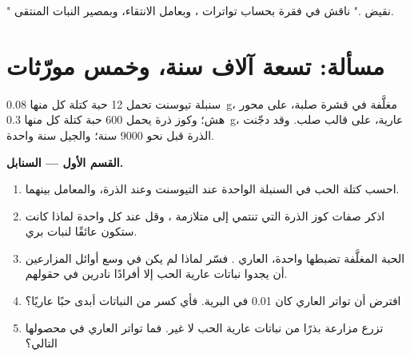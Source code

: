 \begin{exercise}[$\star\star\star$]\label{exo:g12:domesticated-plants:15}
" نقيض ." ناقش في فقرة بحساب تواترات ،
وبعامل الانتقاء، وبمصير النبات المنتقى.
\end{exercise}

\section{مسألة: تسعة آلاف سنة، وخمس مورّثات}

\begin{problem}
\label{pb:g12:domesticated-plants:1}
سنبلة تيوسنت تحمل 12 حبة كتلة كل منها \qty{0.08}{g}، مغلَّفة في قشرة
صلبة، على محور هش؛ وكوز ذرة يحمل 600 حبة كتلة كل منها \qty{0.3}{g}،
عارية، على قالب صلب. وقد دجّنت الذرة قبل نحو 9000 سنة؛ والجيل سنة
واحدة.

\medskip
\noindent\textbf{القسم الأول --- السنابل.}
\begin{enumerate}
  \item احسب كتلة الحب في السنبلة الواحدة عند التيوسنت وعند الذرة،
        والمعامل بينهما.
  \item اذكر صفات كوز الذرة التي تنتمي إلى متلازمة ، وقل عند كل
        واحدة لماذا كانت ستكون عائقًا لنبات بري.
  \item الحبة المغلَّفة تضبطها  واحدة،  العاري . فسّر
        لماذا لم يكن في وسع أوائل المزارعين أن يجدوا نباتات عارية
        الحب إلا أفرادًا نادرين في حقولهم.
  \item افترض أن تواتر  العاري كان 0.01 في  البرية. فأي
        كسر من النباتات أبدى حبًا عاريًا؟
  \item تزرع مزارعة بذرًا من نباتات عارية الحب لا غير. فما تواتر 
        العاري في محصولها التالي؟
\end{enumerate}


\end{problem}
